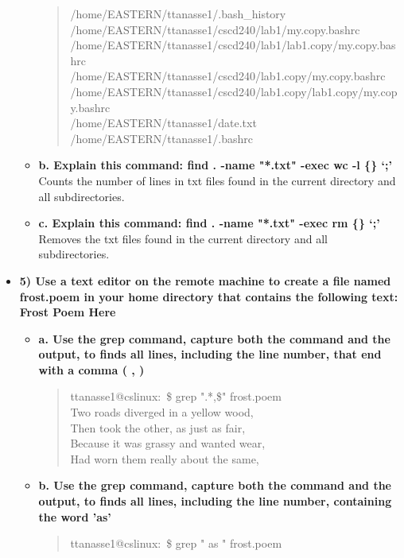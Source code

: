 \documentclass{article}
\begin{document}
\begin{itemize}
\begin{itemize}
\begin{quote}
/home/EASTERN/ttanasse1/.bash\_history\\
/home/EASTERN/ttanasse1/cscd240/lab1/my.copy.bashrc\\
/home/EASTERN/ttanasse1/cscd240/lab1/lab1.copy/my.copy.bashrc\\
/home/EASTERN/ttanasse1/cscd240/lab1.copy/my.copy.bashrc\\
/home/EASTERN/ttanasse1/cscd240/lab1.copy/lab1.copy/my.copy.bashrc\\
/home/EASTERN/ttanasse1/date.txt\\
/home/EASTERN/ttanasse1/.bashrc
    \end{quote}
    \item \textbf{b. Explain this command: find . -name "*.txt" -exec wc -l  \{\}   ‘;’}\\
    Counts the number of lines in txt files found in the current directory and all subdirectories.
    \item \textbf{c. Explain this command: find . -name "*.txt" -exec  rm  \{\}   ‘;’}\\
    Removes the txt files found in the current directory and all subdirectories. 
  \end{itemize}
  \item \textbf{5) Use a text editor on the remote machine to create a file named frost.poem in your home directory that contains the following text:\\
Frost Poem Here}\\
  \begin{itemize}
    \item \textbf{a. Use the grep command, capture both the command and the output, to finds all lines, including the line number, that end with a comma ( , )}\\
    \begin{quote}
      ttanasse1@cslinux:~\$ grep ".*,\$" frost.poem\\
Two roads diverged in a yellow wood,\\
Then took the other, as just as fair,\\
Because it was grassy and wanted wear,\\
Had worn them really about the same,
    \end{quote}
    \item \textbf{b. Use the grep command, capture both the command and the output, to finds all lines, including the line number, containing the word 'as'}
    \begin{quote}
      ttanasse1@cslinux:~\$ grep " as " frost.poem\\

\end{quote}
\end{itemize}
\end{itemize}
\end{document}
